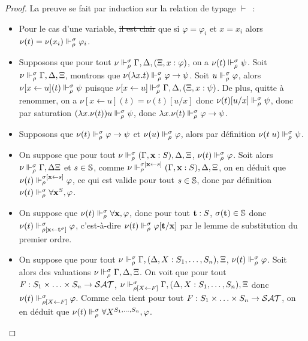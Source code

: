 \documentclass{article}
\begin{document}
\begin{proof}
  La preuve se fait par induction sur la relation de typage $\vdash$~:
  \begin{itemize}
  \item Pour le cas d'une variable, \st{il est clair} que si $\varphi = \varphi_i$ et $x = x_i$ alors $\nu(t) = \nu(x_i)\Vdash_\rho^\sigma \varphi_i$.
  \item Supposons que pour tout $\nu \Vdash_\rho^\sigma \Gamma,\Delta,(\Xi, x : \varphi)$, on a $\nu(t) \Vdash_\rho^\sigma \psi$. Soit $\nu \Vdash_\rho^\sigma \Gamma,\Delta,\Xi$, montrons que $\nu(\lambda x.t)\Vdash_\rho^\sigma \varphi \to \psi$. Soit $u \Vdash_\rho^\sigma \varphi$, alors $\nu[x \leftarrow u](t)\Vdash_\rho^\sigma \psi$ puisque $\nu[x\leftarrow u]\Vdash_\rho^\sigma \Gamma,\Delta,(\Xi, x : \psi)$. De plus, quitte à renommer, on a $\nu[x\leftarrow u](t) = \nu(t)[u/x]$ donc $\nu(t)[u/x]\Vdash_\rho^\sigma \psi$, donc par saturation $(\lambda x.\nu(t)) u \Vdash_\rho^\sigma \psi$, donc $\lambda x.\nu(t)\Vdash_\rho^\sigma \varphi\to\psi$.
  \item Supposons que $\nu(t)\Vdash_\rho^\sigma \varphi \to \psi$ et $\nu(u)\Vdash_\rho^\sigma \varphi$, alors par définition $\nu(t\;u)\Vdash_\rho^\sigma \psi$.
  \item On suppose que pour tout $\nu\Vdash_\rho^\sigma (\Gamma, \mathbf{x} : S),\Delta,\Xi$, $\nu(t)\Vdash_\rho^\sigma \varphi$. Soit alors $\nu\Vdash_\rho^\sigma \Gamma,\Delta\Xi$ et $s \in \mathbb{S}$, comme $\nu\Vdash_\rho^{\sigma[\mathbf{x}\leftarrow s]} (\Gamma,\mathbf{x} : S), \Delta,\Xi$, on en déduit que $\nu(t)\Vdash_\rho^{\sigma[\mathbf{x}\leftarrow s]} \varphi$, ce qui est valide pour tout $s\in \mathbb{S}$, donc par définition $\nu(t)\Vdash_\rho^\sigma \forall \mathbf{x}^S, \varphi$.
  \item On suppose que $\nu(t)\Vdash_\rho^\sigma \forall \mathbf{x}, \varphi$, donc pour tout $\mathbf{t} : S$, $\sigma(\mathbf{t}) \in \mathbb S$ donc $\nu(t)\Vdash_{\rho[\mathbf{x}\leftarrow \mathbf{t}^\sigma]}^\sigma \varphi$, c'est-à-dire $\nu(t)\Vdash_\rho^\sigma \varphi[\mathbf{t}/\mathbf{x}]$ par le lemme de substitution du premier ordre.
  \item On suppose que pour tout $\nu\Vdash_\rho^\sigma \Gamma, (\Delta, X : S_1,\ldots,S_n), \Xi$, $\nu(t) \Vdash_\rho^\sigma \varphi$. Soit alors des valuations $\nu\Vdash_\rho^\sigma\Gamma, \Delta,\Xi$. On voit que pour tout $F : S_1\times\ldots\times S_n \to \mathcal {SAT}$, $\nu\Vdash_{\rho[X\leftarrow F]}^\sigma \Gamma, (\Delta, X : S_1,\ldots,S_n),\Xi$ donc $\nu(t)\Vdash_{\rho[X\leftarrow F]}^\sigma \varphi$. Comme cela tient pour tout $F : S_1\times\ldots\times S_n \to \mathcal {SAT}$, on en déduit que $\nu(t)\Vdash_\rho^\sigma \forall X^{S_1,\ldots,S_n}, \varphi$.

\end{itemize}
\end{proof}
\end{document}
